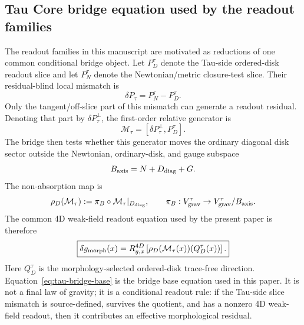 \documentclass[11pt]{article}
\begin{document}
\noindent{}

\subsection{Tau Core bridge equation used by the readout families}

The readout families in this manuscript are motivated as reductions of one
common conditional bridge object.  Let \(P_D^\tau\) denote the Tau-side
ordered-disk readout slice and let \(P_N^\tau\) denote the Newtonian/metric
closure-test slice.  Their residual-blind local mismatch is
\[
\delta P_\tau = P_N^\tau-P_D^\tau .
\]
Only the tangent/off-slice part of this mismatch can generate a readout
residual.  Denoting that part by \(\delta P_\tau^\perp\), the first-order
relative generator is
\[
\mathcal M_\tau=[\delta P_\tau^\perp,P_D^\tau] .
\]
The bridge then tests whether this generator moves the ordinary diagonal disk
sector outside the Newtonian, ordinary-disk, and gauge subspace
\[
B_{\rm axis}=N+D_{\rm diag}+G .
\]
The non-absorption map is
\[
\rho_D(\mathcal M_\tau)
 :=
\pi_B\circ \mathcal M_\tau|_{D_{\rm diag}},
\qquad
\pi_B:V_{\rm grav}^\tau\to V_{\rm grav}^\tau/B_{\rm axis}.
\]
The common 4D weak-field readout equation used by the present paper is therefore
\begin{equation}
\boxed{
\delta g_{\rm morph}(x)
=
R^{4D}_{g,x}
\left[
\rho_D(\mathcal M_\tau(x))(Q_D^\tau(x))
\right].
}
\label{eq:tau-bridge-base}
\end{equation}
Here \(Q_D^\tau\) is the morphology-selected ordered-disk trace-free direction.
Equation~\eqref{eq:tau-bridge-base} is the bridge base equation used in this
paper.  It is not a final law of gravity; it is a conditional readout rule:
if the Tau-side slice mismatch is source-defined, survives the quotient, and
has a nonzero 4D weak-field readout, then it contributes an effective
morphological residual.
\end{document}
